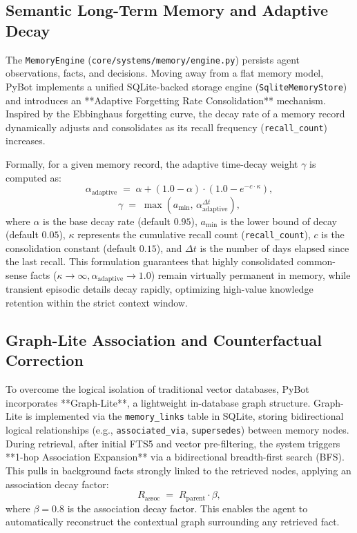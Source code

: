 \documentclass[11pt,a4paper]{article}
\begin{document}
\subsection{Semantic Long-Term Memory and Adaptive Decay}
\label{sec:semantic-memory}

The \texttt{MemoryEngine} (\texttt{core/systems/memory/engine.py}) persists agent observations, facts, and decisions. Moving away from a flat memory model, PyBot implements a unified SQLite-backed storage engine (\texttt{SqliteMemoryStore}) and introduces an **Adaptive Forgetting Rate Consolidation** mechanism. Inspired by the Ebbinghaus forgetting curve, the decay rate of a memory record dynamically adjusts and consolidates as its recall frequency (\texttt{recall\_count}) increases.

Formally, for a given memory record, the adaptive time-decay weight $\gamma$ is computed as:
\begin{equation}
  \alpha_{\text{adaptive}} \;=\; \alpha + (1.0 - \alpha) \cdot \left(1.0 - e^{-c \cdot \kappa}\right),
\end{equation}
\begin{equation}
  \gamma \;=\; \max\left(a_{\text{min}},\, \alpha_{\text{adaptive}}^{\Delta t}\right),
\end{equation}
where $\alpha$ is the base decay rate (default $0.95$), $a_{\text{min}}$ is the lower bound of decay (default $0.05$), $\kappa$ represents the cumulative recall count (\texttt{recall\_count}), $c$ is the consolidation constant (default $0.15$), and $\Delta t$ is the number of days elapsed since the last recall. This formulation guarantees that highly consolidated common-sense facts ($\kappa \to \infty, \alpha_{\text{adaptive}} \to 1.0$) remain virtually permanent in memory, while transient episodic details decay rapidly, optimizing high-value knowledge retention within the strict context window.

\subsection{Graph-Lite Association and Counterfactual Correction}
\label{sec:graph-lite}

To overcome the logical isolation of traditional vector databases, PyBot incorporates **Graph-Lite**, a lightweight in-database graph structure. Graph-Lite is implemented via the \texttt{memory\_links} table in SQLite, storing bidirectional logical relationships (e.g., \texttt{associated\_via}, \texttt{supersedes}) between memory nodes.
During retrieval, after initial FTS5 and vector pre-filtering, the system triggers **1-hop Association Expansion** via a bidirectional breadth-first search (BFS). This pulls in background facts strongly linked to the retrieved nodes, applying an association decay factor:
\begin{equation}
  R_{\text{assoc}} \;=\; R_{\text{parent}} \cdot \beta,
\end{equation}
where $\beta = 0.8$ is the association decay factor. This enables the agent to automatically reconstruct the contextual graph surrounding any retrieved fact.
\end{document}
